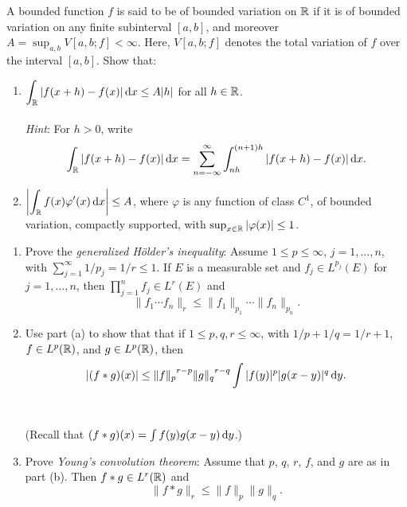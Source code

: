 \begin{problem}
  A bounded function \(f\) is said to be of bounded variation on \(\mathbb{R}\)
  if it is of bounded variation on any finite subinterval \([a,b]\), and
  moreover \(A=\sup_{a,b}V[a,b;f]<\infty\). Here, \(V[a,b;f]\) denotes the
  total variation of \(f\) over the interval \([a,b]\). Show that:
\begin{enumerate}[label=(\alph*),noitemsep]
\item \(\displaystyle\int_{\mathbb{R}}|f(x+h)-f(x)|\mathop{}\!\mathrm{d} x\leq A|h|\) for all
  \(h\in\mathbb{R}\).
  \\\\
  \emph{Hint}: For \(h>0\), write
\[
\int_{\mathbb{R}} |f(x+h)-f(x)|\mathop{}\!\mathrm{d} x=
\sum_{n=-\infty}^\infty\int_{nh}^{(n+1)h}|f(x+h)-f(x)|\mathop{}\!\mathrm{d} x.
\]
\item
  \(\displaystyle\left|\int_{\mathbb{R}} f(x)\varphi'(x)\mathop{}\!\mathrm{d} x\right|\leq A\),
  where \(\varphi\) is any function of class \(C^1\), of bounded variation,
  compactly supported, with \(\sup_{x\in\mathbb{R}}|\varphi(x)|\leq 1\).
\end{enumerate}
\end{problem}
\begin{solution}
\end{solution}

\begin{problem}
\begin{enumerate}[label=(\alph*),noitemsep]
\item Prove the \emph{generalized Hölder's inequality}: Assume
  \(1\leq p\leq\infty\), \(j=1,\dotsc,n\), with
  \(\sum_{j=1}^\infty 1/p_j=1/r\leq 1\). If \(E\) is a measurable set and
  \(f_j\in L^{p_j}(E)\) for \(j=1,\dotsc,n\), then
  \(\prod_{j=1}^n f_j\in L^r(E)\) and
    \[
      \|f_1\dotsm f_n\|_r\leq\|f_1\|_{p_1}\dotsm\|f_n\|_{p_n}.
    \]
  \item Use part (a) to show that that if \(1\leq p,q,r\leq\infty\), with
    \(1/p+1/q=1/r+1\), \(f\in L^p(\mathbb{R})\), and \(g\in L^p(\mathbb{R})\), then
\[
|(f*g)(x)|\leq{\|f\|_p}^{r-p}{\|g\|_q}^{r-q}\int|f(y)|^p|g(x-y)|^q\mathop{}\!\mathrm{d} y.
\]
\\\\
(Recall that \((f*g)(x)=\int f(y)g(x-y)\mathop{}\!\mathrm{d} y\).)
\item Prove \emph{Young's convolution theorem}: Assume that \(p\), \(q\),
  \(r\), \(f\), and \(g\) are as in part (b). Then \(f*g\in L^r(\mathbb{R})\) and
  \[
    \|f*g\|_r\leq\|f\|_p\|g\|_q.
  \]
\end{enumerate}
\end{problem}
\begin{solution}
\end{solution}

